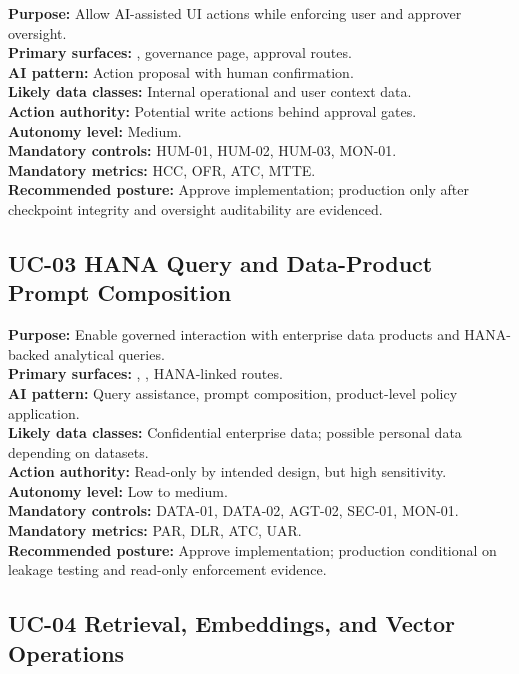 \documentclass[11pt,a4paper]{article}
\begin{document}
\textbf{Purpose:} Allow AI-assisted UI actions while enforcing user and approver oversight.\\
\textbf{Primary surfaces:} , governance page, approval routes.\\
\textbf{AI pattern:} Action proposal with human confirmation.\\
\textbf{Likely data classes:} Internal operational and user context data.\\
\textbf{Action authority:} Potential write actions behind approval gates.\\
\textbf{Autonomy level:} Medium.\\
\textbf{Mandatory controls:} HUM-01, HUM-02, HUM-03, MON-01.\\
\textbf{Mandatory metrics:} HCC, OFR, ATC, MTTE.\\
\textbf{Recommended posture:} Approve implementation; production only after checkpoint integrity and oversight auditability are evidenced.

\subsection{UC-03 HANA Query and Data-Product Prompt Composition}

\textbf{Purpose:} Enable governed interaction with enterprise data products and HANA-backed analytical queries.\\
\textbf{Primary surfaces:} , , HANA-linked routes.\\
\textbf{AI pattern:} Query assistance, prompt composition, product-level policy application.\\
\textbf{Likely data classes:} Confidential enterprise data; possible personal data depending on datasets.\\
\textbf{Action authority:} Read-only by intended design, but high sensitivity.\\
\textbf{Autonomy level:} Low to medium.\\
\textbf{Mandatory controls:} DATA-01, DATA-02, AGT-02, SEC-01, MON-01.\\
\textbf{Mandatory metrics:} PAR, DLR, ATC, UAR.\\
\textbf{Recommended posture:} Approve implementation; production conditional on leakage testing and read-only enforcement evidence.

\subsection{UC-04 Retrieval, Embeddings, and Vector Operations}
\end{document}
